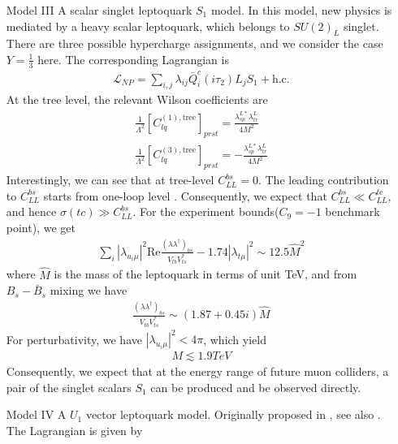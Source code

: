 \documentclass[a4paper,11pt]{article}
\begin{document}
\begin{enumerate}
    \item[Model III] A scalar singlet leptoquark $S_1$ model.
        In this model, new physics is mediated by a heavy scalar leptoquark, which belongs to $SU(2)_{L}$ singlet.
        There are three possible hypercharge assignments,
        and we consider the case $Y=\frac{1}{3}$ here.
        The corresponding Lagrangian is
        \begin{align}
            \mathcal{L}_{NP}=\sum_{i,j}\lambda_{ij}\bar{Q}^c_i(i\tau_2)L_jS_1+\textrm{h.c.}
        \end{align}
        At the tree level, the relevant Wilson coefficients are
        \begin{align}
            \frac{1}{\Lambda^2}[C_{lq}^{(1),\textrm{tree}}]_{prst}=\frac{\lambda_{sp}^{L*}\lambda_{tr}^{L}}{4M^2}\\
            \frac{1}{\Lambda^2}[C_{lq}^{(3),\textrm{tree}}]_{prst}=-\frac{\lambda_{sp}^{L*}\lambda_{tr}^{L}}{4M^2}
        \end{align}
        Interestingly, we can see that at tree-level $C_{LL}^{bs}=0$.
        The leading contribution to $C_{LL}^{bs}$ starts from one-loop level \cite{Bauer:2015knc}.
        Consequently, we expect that $C_{LL}^{bs}\ll C_{LL}^{tc}$,
        and hence $\sigma(tc)\gg C_{LL}^{bs}$.
        For the experiment bounds($C_9=-1$ benchmark point), we get
        \begin{align}
            \sum_{i}|\lambda_{u_i\mu}|^2\mathrm{Re}\frac{(\lambda\lambda^{\dag})_{bs}}{V_{tb}V_{ts}^{*}}-1.74|\lambda_{t\mu}|^2\sim 12.5\hat{M}^2
        \end{align}
        where $\hat{M}$ is the mass of the leptoquark in terms of unit TeV,
        and from $B_s-\bar{B}_s$ mixing we have
        \begin{align}
            \frac{(\lambda\lambda^{\dag})_{bs}}{V_{tb}V_{ts}^{*}}\sim(1.87+0.45i)\hat{M}
        \end{align}
        For perturbativity, we have $|\lambda_{u_i\mu}|^2<4\pi$, which yield
        \begin{align}
            M\lesssim 1.9\si{TeV}
        \end{align}
        Consequently, we expect that at the energy range of future muon colliders, a pair of the singlet scalars $S_1$  can be produced and be observed directly.
\item[Model IV] A $U_1$ vector leptoquark model. Originally proposed in \cite{Barbieri:2015yvd},
see also \cite{Buttazzo:2017ixm}.
        The Lagrangian is given by 
        \begin{align}

\end{align}
\end{enumerate}
\end{document}
